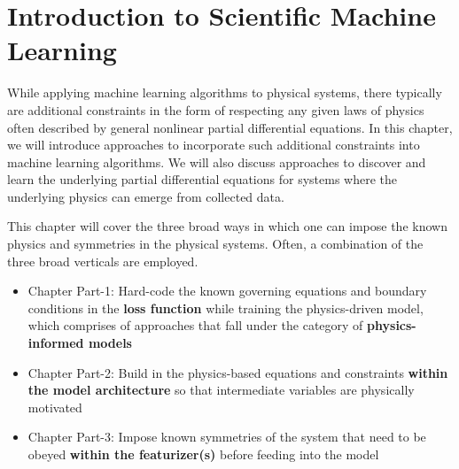 \documentclass[book.tex]{subfiles}
\begin{document}
\chapter{Introduction to Scientific Machine Learning}
\label{ch:intro-molecular-ml}
While applying machine learning algorithms to physical systems, there typically are additional constraints in the form of respecting any given laws of physics often described by general nonlinear partial differential equations. In this chapter, we will introduce approaches to incorporate such additional constraints into machine learning algorithms. We will also discuss approaches to discover and learn the underlying partial differential equations for systems where the underlying physics can emerge from collected data. 

This chapter will cover the three broad ways in which one can impose the known physics and symmetries in the physical systems. Often, a combination of the three broad verticals are employed. 

\begin{itemize}
    \item Chapter Part-1: Hard-code the known governing equations and boundary conditions in the \textbf{loss function} while training the physics-driven model, which comprises of approaches that fall under the category of \textbf{physics-informed models} 
    \item Chapter Part-2: Build in the physics-based equations and constraints \textbf{within the model architecture} so that intermediate variables are physically motivated
    \item Chapter Part-3: Impose known symmetries of the system that need to be obeyed \textbf{within the featurizer(s)} before feeding into the model
\end{itemize}
\end{document}
